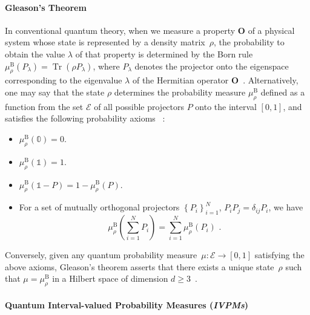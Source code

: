 \documentclass[english,reprint, aps, prl,superscriptaddress, showpacs,
showkeys, longbibliography, amsmath, amssymb]{revtex4-1}
\theoremstyle{plain}
\theoremstyle{definition}
\newcommand{\events}{\ensuremath{\mathcal{E}}}
\newcommand{\Tr}{\mathop{\mathrm{Tr}}\nolimits}
\begin{document}
\paragraph{Gleason's Theorem}

In conventional quantum theory, when we measure a property $\mathbf{O}$
of a physical system whose state is represented by a density matrix~$\rho$,
the probability to obtain the value $\lambda$ of that property is determined by the
Born rule $\mu_{\rho}^{\mathrm{B}}\left(P_{\lambda}\right)=\Tr\left(\rho P_{\lambda}\right)$,
where $P_{\lambda}$ denotes the projector onto the eigenspace corresponding
to the eigenvalue $\lambda$ of the Hermitian operator
$\mathbf{O}$~\cite{Born1983,peres1995quantum,544199,Jaeger2007}. 
Alternatively, one may say that the state $\rho$ determines the 
probability measure $\mu_{\rho}^{\mathrm{B}}$ defined as a
function from the set $\events$ of all possible projectors $P$ onto the interval 
$[0,1]$, and satisfies the following probability axioms~
\cite{10.2307/2308516,gleason1957,Redhead1987-REDINA,Maassen2010}: 
\begin{itemize}
\item $\mu_{\rho}^{\mathrm{B}}(\mathbb{0})=0$. 
\item $\mu_{\rho}^{\mathrm{B}}(\mathbb{1})=1$. 
\item $\mu_{\rho}^{\mathrm{B}}\left(\mathbb{1}-P\right)=
1-\mu_{\rho}^{\mathrm{B}}\left(P\right)$. 
\item For a set of mutually orthogonal projectors $\left\{ P_{i}\right\} _{i=1}^{N}$,
$P_iP_j=\delta_{ij}P_i$,
we have 
\begin{equation}
\mu_{\rho}^{\mathrm{B}}\left(\sum_{i=1}^{N}P_{i}\right)=
\sum_{i=1}^{N}\mu_{\rho}^{\mathrm{B}}\left(P_{i}\right)
\textrm{ .}\label{eq:QuantumProbability-Addition}
\end{equation}
\end{itemize}
Conversely, given any quantum probability measure~$\mu:\events\rightarrow[0,1]$
satisfying the above axioms, Gleason's theorem asserts that there
exists a unique state~$\rho$ such that $\mu=\mu_{\rho}^{\mathrm{B}}$
in a Hilbert space of dimension $d\geq3$~\cite{gleason1957,Redhead1987-REDINA,peres1995quantum}.

\paragraph{Quantum Interval-valued Probability Measures (\emph{IVPMs})}
\end{document}
